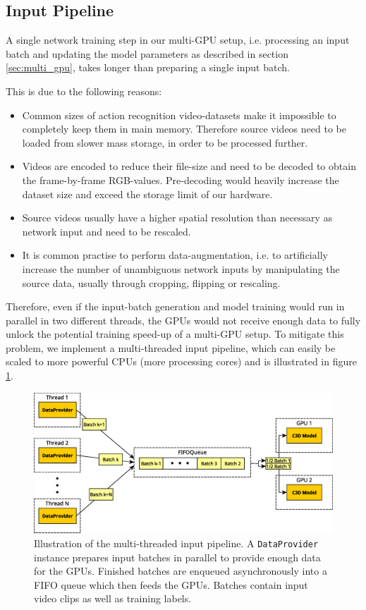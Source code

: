 \subsection{Input Pipeline}
A single network training step in our multi-GPU setup, i.e. processing an input batch and updating the model parameters as described in section \ref{sec:multi_gpu}, takes longer than preparing a single input batch.

This is due to the following reasons:
\begin{itemize}
    \item 
    Common sizes of action recognition video-datasets make it impossible to completely keep them in main memory.
    Therefore source videos need to be loaded from slower mass storage, in order to be processed further.
    \item 
    Videos are encoded to reduce their file-size and need to be decoded to obtain the frame-by-frame RGB-values.
    Pre-decoding would heavily increase the dataset size and exceed the storage limit of our hardware.
    \item
    Source videos usually have a higher spatial resolution than necessary as network input and need to be rescaled.
    \item
    It is common practise to perform data-augmentation, i.e. to artificially increase the number of unambiguous network inputs by manipulating the source data, usually through cropping, flipping or rescaling.
\end{itemize}

Therefore, even if the input-batch generation and model training would run in parallel in two different threads, the GPUs would not receive enough data to fully unlock the potential training speed-up of a multi-GPU setup.
To mitigate this problem, we implement a multi-threaded input pipeline, which can easily be scaled to more powerful CPUs (more processing cores) and is illustrated in figure \ref{fig:input_pipeline}.

\begin{figure}[H]
    \centering
    \includegraphics[width=\textwidth]{img_approach/input_pipeline.eps}
    \caption{Illustration of the multi-threaded input pipeline. A \texttt{DataProvider} instance prepares input batches in parallel to provide enough data for the GPUs. Finished batches are enqueued asynchronously into a FIFO queue which then feeds the GPUs. Batches contain input video clips as well as training labels.}
    \label{fig:input_pipeline}
\end{figure}

